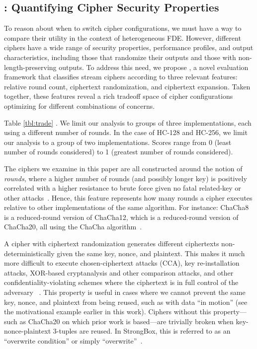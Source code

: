\subsection{\sysC: Quantifying Cipher Security
Properties}\label{subsec:des-trade}

To reason about when to switch cipher configurations, we must have a way to
compare their utility in the context of heterogeneous FDE. However, different
ciphers have a wide range of security properties, performance profiles, and
output characteristics, including those that randomize their outputs and those
with non-length-preserving outputs. To address this need, we propose \sysC, a
novel evaluation framework that classifies stream ciphers according to three
relevant features: relative round count, ciphertext randomization, and
ciphertext expansion. Taken together, these features reveal a rich tradeoff
space of cipher configurations optimizing for different combinations of
concerns.

Table \cref{tbl:trade} . We limit our analysis to groups of
three implementations, each using a different number of rounds. In the case of
HC-128 and HC-256, we limit our analysis to a group of two implementations.
Scores range from 0 (least number of rounds considered) to 1 (greatest number of
rounds considered).




 The ciphers we examine in this paper are all
constructed around the notion of \emph{rounds}, where a higher number of rounds
(and possibly longer key) is positively correlated with a higher resistance to
brute force given no fatal related-key or other
attacks~\cite{ChaCha-Cryptanalysis}. Hence, this feature represents how many
rounds a cipher executes relative to other implementations of the same
algorithm. For instance: ChaCha8 is a reduced-round version of ChaCha12, which
is a reduced-round version of ChaCha20, all using the ChaCha
algorithm~\cite{ChaCha20,ChaCha-Cryptanalysis}.


 A cipher with ciphertext
randomization generates different ciphertexts non-deterministically given the
same key, nonce, and plaintext. This makes it much more difficult to execute
chosen-ciphertext attacks (CCA), key re-installation attacks, XOR-based
cryptanalysis and other comparison attacks, and other confidentiality-violating
schemes where the ciphertext is in full control of the adversary
~\cite{Freestyle}. This property is useful in cases where we cannot prevent the
same key, nonce, and plaintext from being reused, such as with data ``in
motion'' (see the motivational example earlier in this work). Ciphers without
this property---such as ChaCha20 on which prior work is based---are trivially
broken when key-nonce-plaintext 3-tuples are reused. In StrongBox, this is
referred to as an ``overwrite condition'' or simply
``overwrite''~\cite{StrongBox}.

